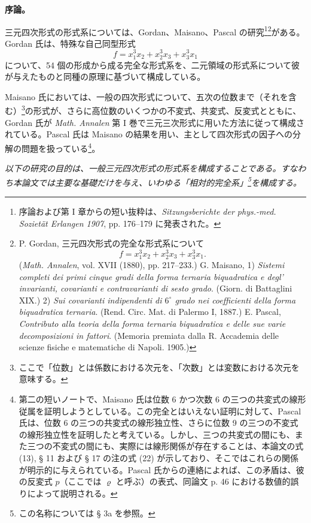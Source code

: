 \documentclass[11pt]{article}
\begin{document}
\vspace{3em}

\begin{center}
\textbf{序論。}
\end{center}

三元四次形式の形式系については、Gordan、Maisano、Pascal の研究\footnote{序論および第 I 章からの短い抜粋は、\emph{Sitzungsberichte der phys.-med. Sozietät Erlangen 1907}, pp. 176--179 に発表された。}\footnote{P. Gordan, 三元四次形式の完全な形式系について
\[
f=x_1^3x_2+x_2^3x_3+x_3^3x_1.
\]
(\emph{Math. Annalen}, vol. XVII (1880), pp. 217--233.)
G. Maisano, 1) \emph{Sistemi completi dei primi cinque gradi della forma ternaria biquadratica e degl' invarianti, covarianti e contravarianti di sesto grado}. (Giorn. di Battaglini XIX.)
2) \emph{Sui covarianti indipendenti di $6^\circ$ grado nei coefficienti della forma biquadratica ternaria}. (Rend. Circ. Mat. di Palermo I, 1887.)
E. Pascal, \emph{Contributo alla teoria della forma ternaria biquadratica e delle sue varie decomposizioni in fattori}. (Memoria premiata dalla R. Accademia delle scienze fisiche e matematiche di Napoli. 1905.)}がある。Gordan 氏は、特殊な自己同型形式
\[
f=x_1^3x_2+x_2^3x_3+x_3^3x_1
\]
について、54 個の形成から成る完全な形式系を、二元領域の形式系について彼が与えたものと同種の原理に基づいて構成している。

Maisano 氏においては、一般の四次形式について、五次の位数まで（それを含む）\footnote{ここで「位数」とは係数における次元を、「次数」とは変数における次元を意味する。}の形式が、さらに高位数のいくつかの不変式、共変式、反変式とともに、Gordan 氏が \emph{Math. Annalen} 第 I 巻で三元三次形式に用いた方法に従って構成されている。Pascal 氏は Maisano の結果を用い、主として四次形式の因子への分解の問題を扱っている\footnote{第二の短いノートで、Maisano 氏は位数 6 かつ次数 6 の三つの共変式の線形従属を証明しようとしている。この完全とはいえない証明に対して、Pascal 氏は、位数 6 の三つの共変式の線形独立性、さらに位数 9 の三つの不変式の線形独立性を証明したと考えている。しかし、三つの共変式の間にも、また三つの不変式の間にも、実際には線形関係が存在することは、本論文の式 (13), § 11 および § 17 の注の式 (22) が示しており、そこではこれらの関係が明示的に与えられている。Pascal 氏からの連絡によれば、この矛盾は、彼の反変式 $p$（ここでは $\varrho$ と呼ぶ）の表式、同論文 p. 46 における数値的誤りによって説明される。}。

\emph{以下の研究の目的は、一般三元四次形式の形式系を構成することである。すなわち本論文では主要な基礎だけを与え、いわゆる「相対的完全系」\footnote{この名称については § 3a を参照。}を構成する。}
\end{document}
